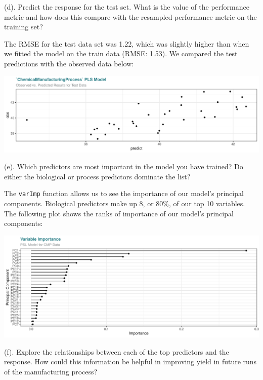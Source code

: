 \documentclass[]{report}
\begin{document}
\begin{subquestion}{(d).} Predict the response for the test set. What is the value of the performance metric and how does this compare with the resampled performance metric on the training set? 
\end{subquestion}

The RMSE for the test data set was 1.22, which was slightly higher than
when we fitted the model on the train data (RMSE: 1.53). We compared the
test predictions with the observed data below:

\includegraphics{Format_Test_files/figure-latex/kj-6.3d-1-1.pdf}

\begin{subquestion}{(e).} Which predictors are most important in the model you have trained? Do either the biological or process predictors dominate the list? 
\end{subquestion}

The \texttt{varImp} function allows us to see the importance of our
model's principal components. Biological predictors make up 8, or 80\%,
of our top 10 variables. The following plot shows the ranks of
importance of our model's principal components:

\includegraphics{Format_Test_files/figure-latex/kj-6.3e-1-1.pdf}

\begin{subquestion}{(f).} Explore the relationships between each of the top predictors and the response. How could this information be helpful in improving yield in future runs of the manufacturing process?
\end{subquestion}
\end{document}

